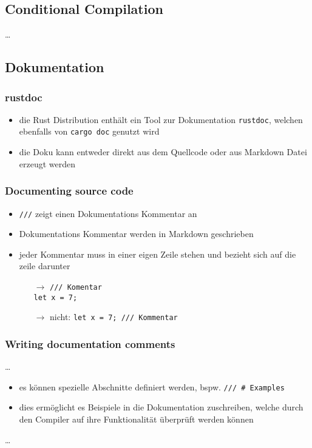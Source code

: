 \documentclass[a4paper,12pt]{article}
\begin{document}
\subsection{Conditional Compilation}
\dots
\subsection{Dokumentation}
\subsubsection*{rustdoc}
	\begin{itemize}
	  \item die Rust Distribution enthält ein Tool zur Dokumentation \verb|rustdoc|, welchen ebenfalls von \verb|cargo doc| genutzt wird 
	  \item die Doku kann entweder direkt aus dem Quellcode oder aus Markdown Datei erzeugt werden
	\end{itemize}
\subsubsection*{Documenting source code}
	\begin{itemize}
	  \item \verb|///| zeigt einen Dokumentations Kommentar an
	  \item Dokumentations Kommentar werden in Markdown geschrieben
	  \item jeder Kommentar muss in einer eigen Zeile stehen und bezieht sich auf die zeile darunter
	  	\begin{itemize}
	  	  \item[$\rightarrow$] \verb|/// Komentar| \\ \verb|let x = 7;|
	  	  \item[$\rightarrow$] nicht: \verb|let x = 7; /// Kommentar| 
	  	\end{itemize}
	\end{itemize}

\subsubsection*{Writing documentation comments}
	\dots
	\begin{itemize}
	\item es können spezielle Abschnitte definiert werden, bspw. \verb|/// # Examples|
	\item dies ermöglicht es Beispiele in die Dokumentation zuschreiben, welche durch den Compiler auf ihre Funktionalität überprüft werden können 
	\end{itemize}
	\dots
\end{document}
